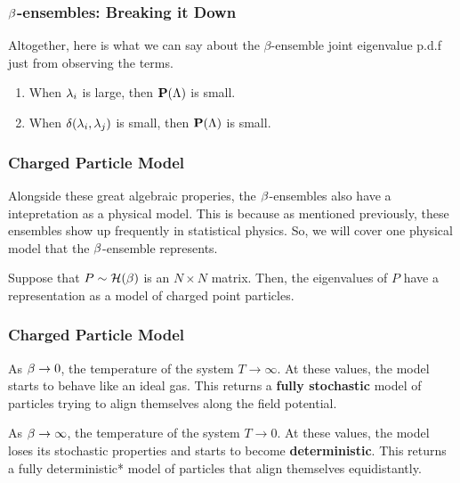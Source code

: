 \begin{frame} \frametitle{$\beta$-ensembles: Breaking it Down}
  Altogether, here is what we can say about the $\beta$-ensemble joint eigenvalue p.d.f just from observing the terms.
    \begin{enumerate}
      \item When $\lambda_i$ is large, then $\textbf{P}(\Lambda)$ is small.
      \item When $\delta(\lambda_i, \lambda_j)$ is small, then $\textbf{P}(\Lambda)$ is small.
    \end{enumerate}
\end{frame}
\begin{frame} \frametitle{Charged Particle Model}

  Alongside these great algebraic properies, the $\beta$-ensembles also have a intepretation as a physical model.
  This is because as mentioned previously, these ensembles show up frequently in statistical physics.
  So, we will cover one physical model that the $\beta$-ensemble represents.

  Suppose that $P \sim \mathcal{H}(\beta)$ is an $N \times N$ matrix. Then, the eigenvalues of $P$ have a representation as a model of charged point particles.

\end{frame}
\begin{frame} \frametitle{Charged Particle Model}
   As $\beta \to 0$, the temperature of the system $T \to \infty$.
  At these values, the model starts to behave like an ideal gas.
   This returns a \textbf{fully stochastic} model of particles trying to align themselves along the field potential.

   As $\beta \to \infty$, the temperature of the system $T \to 0$.
  At these values, the model loses its stochastic properties and starts to become \textbf{deterministic}. This returns a fully deterministic*
  model of particles that align themselves equidistantly.

\end{frame}
